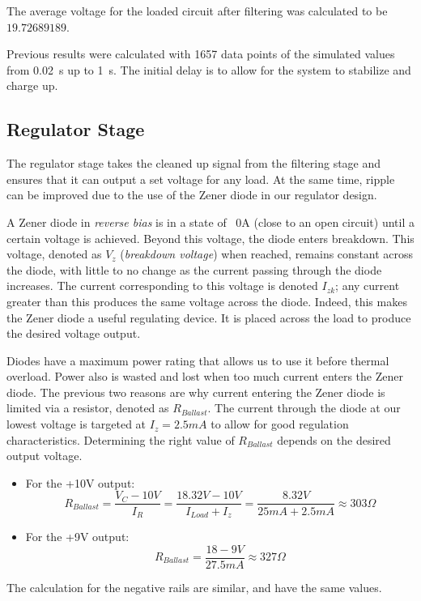 \documentclass[12pt]{article}
\begin{document}
The average voltage for the loaded circuit after filtering was calculated to be \(19.72689189\).

Previous results were calculated with 1657 data points of the simulated values from \SI{0.02}{\second} up to \SI{1}{\second}. The initial delay is to allow for the system to stabilize and charge up.

\subsection{Regulator Stage}
The regulator stage takes the cleaned up signal from the filtering stage and ensures that it can output a set voltage for any load. At the same time, ripple can be improved due to the use of the Zener diode in our regulator design.

A Zener diode in \textit{reverse bias} is in a state of ~0A (close to an open circuit) until a certain voltage is achieved. Beyond this voltage, the diode enters breakdown. This voltage, denoted as $V_z$ (\textit{breakdown voltage}) when reached, remains constant across the diode, with little to no change as the current passing through the diode increases. The current corresponding to this voltage is denoted $I_{zk}$; any current greater than this produces the same voltage across the diode. Indeed, this makes the Zener diode a useful regulating device. It is placed across the load to produce the desired voltage output.\par
Diodes have a maximum power rating that allows us to use it before thermal overload. Power also is wasted and lost when too much current enters the Zener diode. The previous two reasons are why current entering the Zener diode is limited via a resistor, denoted as $R_{Ballast}$. The current through the diode at our lowest voltage is targeted at $I_z = 2.5mA$ to allow for good regulation characteristics. Determining the right value of $R_{Ballast}$ depends on the desired output voltage.
\begin{itemize}
    \item For the +10V output:
    $$R_{Ballast} = \frac{V_C - 10V}{I_R} = \frac{18.32V - 10V}{I_{Load} + I_z} = \frac{8.32V}{25mA + 2.5mA} \approx 303\Omega$$
    
    \item For the +9V output:
    $$R_{Ballast} = \frac{18 - 9V}{27.5mA} \approx 327\Omega$$
\end{itemize}

The calculation for the negative rails are similar, and have the same values.
\end{document}
